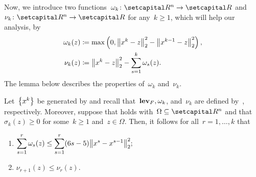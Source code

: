 \documentclass[../main]{subfiles}
\begin{document}
Now, we introduce two functions~$\omega_k \colon \setR^n \to \setR$ and~$\nu_k \colon \setR^n \to \setR$ for any~$k \ge 1$, which will help our analysis, by
\begin{align}
    \omega_k(z) & \coloneqq \max \left( 0, \norm*{x^k - z}_2^2 - \norm*{x^{k - 1} - z}_2^2 \right) \label{eq:omega}, \\
    \nu_k(z)    & \coloneqq \norm*{x^k - z}_2^2 - \sum_{s = 1}^{k} \omega_s(z) \label{eq:nu}
    .\end{align}
The lemma below describes the properties of~$\omega_k$ and~$\nu_k$.
\begin{lemma} 
    Let~$\set*{x^k}$ be generated by  and recall that~$\level_F, \omega_k$, and~$\nu_k$ are defined by~, respectively.
    Moreover, suppose that  holds with~$\Omega \subseteq \setR^n$ and that~$\sigma_k(z) \ge 0$ for some~$k \ge 1$ and~$z \in \Omega$.
    Then, it follows for all~$r = 1, \dots, k$ that
    \begin{enumerate}
        \item $\displaystyle \sum_{s = 1}^{r} \omega_s(z) \le \sum_{s = 1}^{r}(6s - 5) \norm*{x^s - x^{s - 1}}_2^2;$ 
        \item $\displaystyle \nu_{r + 1}(z) \le \nu_r(z).$ 
    \end{enumerate}
\end{lemma}
\end{document}
